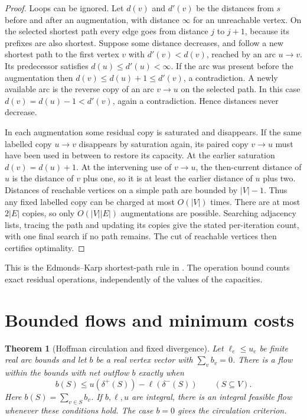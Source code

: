 \documentclass[11pt,oneside,openany]{book}
\theoremstyle{plain}
\newtheorem{theorem}{Theorem}[chapter]
\theoremstyle{definition}
\theoremstyle{remark}
\begin{document}
\begin{proof}
Loops can be ignored. Let \(d(v)\) and \(d'(v)\) be the distances
from \(s\) before and after an augmentation, with distance
\(\infty\) for an unreachable vertex. On the selected shortest
path every edge goes from distance \(j\) to \(j+1\), because its
prefixes are also shortest. Suppose some distance decreases, and
follow a new shortest path to the first vertex \(v\) with
\(d'(v)<d(v)\), reached by an arc \(u\to v\). Its predecessor
satisfies \(d(u)\le d'(u)<\infty\). If the arc was present before
the augmentation then \(d(v)\le d(u)+1\le d'(v)\), a contradiction.
A newly available arc is the reverse copy of an arc \(v\to u\)
on the selected path. In this case \(d(v)=d(u)-1<d'(v)\), again
a contradiction. Hence distances never decrease.

In each augmentation some residual copy is saturated and
disappears. If the same labelled copy \(u\to v\) disappears
by saturation again, its paired copy \(v\to u\) must have been
used in between to restore its capacity. At the earlier
saturation \(d(v)=d(u)+1\). At the intervening use of \(v\to u\),
the then-current distance of \(u\) is the distance of \(v\) plus
one, so it is at least the earlier distance of \(u\) plus two.
Distances of reachable vertices on a simple path are bounded by
\(|V|-1\). Thus any fixed labelled copy can be charged at most
\(O(|V|)\) times. There are at most \(2|E|\) copies, so only
\(O(|V||E|)\) augmentations are possible. Searching adjacency
lists, tracing the path and updating its copies give the stated
per-iteration count, with one final search if no path remains.
The cut of reachable vertices then certifies optimality.
\end{proof}

This is the Edmonds--Karp shortest-path rule in
\cite[vol.~A, Section 10.5]{schrijver}. The operation bound
counts exact residual operations, independently of the values
of the capacities.

\section{Bounded flows and minimum costs}

\begin{theorem}[Hoffman circulation and fixed divergence]\label{p205:W38}
Let \(\ell_e\le u_e\) be finite real arc bounds and let \(b\)
be a real vertex vector with \(\sum_v b_v=0\). There is a flow
within the bounds with net outflow \(b\) exactly when
\[
 b(S)\le u(\delta^+(S))-\ell(\delta^-(S))
                       \qquad(S\subseteq V).
\]
Here \(b(S)=\sum_{v\in S}b_v\). If \(b,\ell,u\) are integral,
there is an integral feasible flow whenever these conditions hold.
The case \(b=0\) gives the circulation criterion.
\end{theorem}
\end{document}
